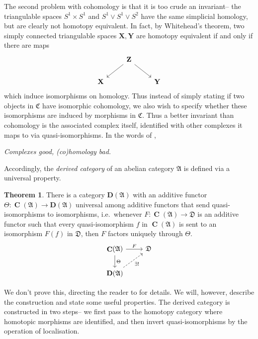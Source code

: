 \documentclass[a4paper]{article}
\theoremstyle{definition}
\newtheorem{theorem}[defn]{Theorem}
\theoremstyle{remark}
\DeclareMathOperator{\Ch}{\mathbf{C}}
\newcommand{\deri}{\mathbf{D}}
\begin{document}
The second problem with cohomology is that it is too crude an invariant-- the
triangulable spaces \(S^1\times S^1\) and \(S^1\vee S^1 \vee S^2\) have the
same simplicial homology, but are clearly not homotopy equivalent. In fact, by
Whitehead's theorem, two simply connected triangulable spaces
\(\mathbf{X},\mathbf{Y}\) are homotopy
equivalent if and only if there are maps 
\[\begin{tikzcd}
    &\mathbf{Z}\arrow[dl]\arrow[dr] &\\
    \mathbf{X} & & \mathbf{Y}
\end{tikzcd}\] 
which induce isomorphisms on homology. Thus instead of simply stating if two
objects in \(\mathfrak{C}\) have isomorphic cohomology, we also wish to specify
whether these isomorphisms are induced by morphisms in \(\mathfrak{C}\). Thus a
better invariant than cohomology is the associated complex itself, identified
with other complexes it maps to via quasi-isomorphisms. In the words of
, 
\begin{center}
    \textit{Complexes good, (co)homology bad.}
\end{center}

Accordingly, the \textit{derived category} of an abelian category
\(\mathfrak{A}\) is defined via a universal property.

\begin{theorem}
    There is a category \(\deri(\mathfrak{A})\) with an additive
    functor \(\Theta: \Ch(\mathfrak{A})\rightarrow \deri(\mathfrak{A})\)
    universal among additive functors that send quasi-isomorphisms to
    isomorphisms, i.e.\ whenever \({F:\Ch(\mathfrak{A})\rightarrow \mathfrak{D}}\)
    is an additive functor such that every quasi-isomorphism \(f\) in
    \(\Ch(\mathfrak{A})\) is sent to an isomorphism \(F(f)\) in \(\mathfrak{D}\),
    then \(F\) factors uniquely through \(\Theta\).
    \[\begin{tikzcd}
        \Ch(\mathfrak{A}) \arrow[d,"\Theta"] \arrow[r,"F"] &  \mathfrak{D} \\ 
        \deri(\mathfrak{A}) \arrow[ru, "\exists!"', dashed] & 
    \end{tikzcd}\]
\end{theorem}

We don't prove this, directing the reader to
 for details. We will, however, describe
the construction and state some useful properties. The derived category is
constructed in two steps-- we first pass to the homotopy category where
homotopic morphisms are identified, and then invert quasi-isomorphisms by the
operation of localisation.
\end{document}
